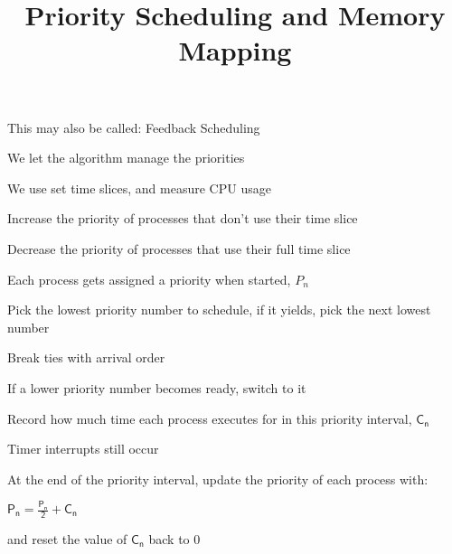 

\title{Priority Scheduling and Memory Mapping}


  \begin{frame}
    \titlepage
  \end{frame}

  \begin{slide}


    This may also be called: Feedback Scheduling
    \medskip

    We let the algorithm manage the priorities

    \leftspace{}We use set time slices, and measure CPU usage
    \medskip

    Increase the priority of processes that don't use their time slice
    \medskip

    Decrease the priority of processes that use their full time slice

  \end{slide}

  \begin{slide}


    Each process gets assigned a priority when started, $P_n$
    \medskip

    Pick the lowest priority number to schedule, if it yields, pick the
    next lowest number

    \leftspace{}Break ties with arrival order

    \leftspace{}If a lower priority number becomes ready, switch to it
    \medskip

    Record how much time each process executes for in this priority interval,
    $\mathsf{C_n}$

    \leftspace{}Timer interrupts still occur
    \medskip
  
    At the end of the priority interval, update the priority of each process
    with:

    \leftspace{}$\mathsf{P_n =  \frac{P_n}{2} + C_n}$ 

    \leftspace{}and reset the value of $\mathsf{C_n}$ back to 0

  \end{slide}

